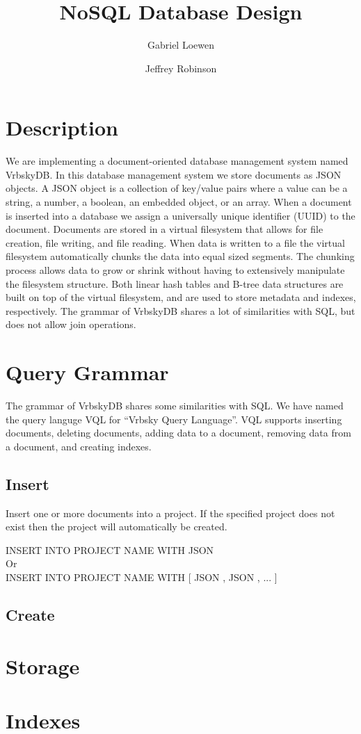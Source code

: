\documentclass{article}
\newcommand\la{\textlangle\xspace}
\newcommand\ra{\textrangle\xspace}
\begin{document}
\title{NoSQL Database Design}
\author{Gabriel Loewen \and Jeffrey Robinson}

\maketitle

\section{Description}
We are implementing a document-oriented database management system named VrbskyDB.  In this database management system we store documents as JSON objects.  A JSON object is a collection of key/value pairs where a value can be a string, a number, a boolean, an embedded object, or an array.  When a document is inserted into a database we assign a universally unique identifier (UUID) to the document.  Documents are stored in a virtual filesystem that allows for file creation, file writing, and file reading.  When data is written to a file the virtual filesystem automatically chunks the data into equal sized segments.  The chunking process allows data to grow or shrink without having to extensively manipulate the filesystem structure.  Both linear hash tables and B-tree data structures are built on top of the virtual filesystem, and are used to store metadata and indexes, respectively.  The grammar of VrbskyDB shares a lot of similarities with SQL, but does not allow join operations.

\section{Query Grammar}
The grammar of VrbskyDB shares some similarities with SQL.  We have named the query languge VQL for ``Vrbsky Query Language''.  VQL supports inserting documents, deleting documents, adding data to a document, removing data from a document, and creating indexes.

\subsection{Insert}
Insert one or more documents into a project.  If the specified project does not exist then the project will automatically be created.
\begin{center}
INSERT INTO \la PROJECT NAME \ra WITH \la JSON \ra \\
Or \\
INSERT INTO \la PROJECT NAME \ra WITH [ \la JSON \ra, \la JSON \ra, ... ]
\end{center}

\subsection{Create}

\section{Storage}

\section{Indexes}
\end{document}
